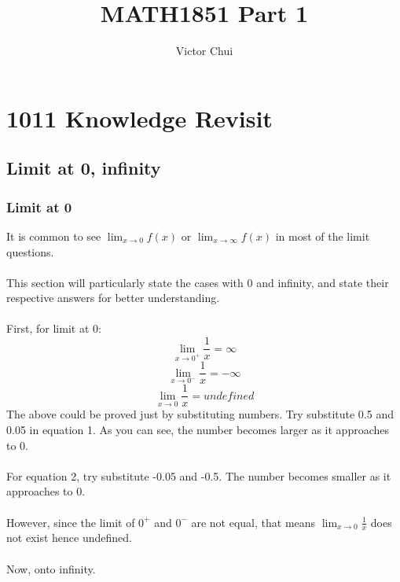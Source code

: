 \documentclass{article}
\title{MATH1851 Part 1}
\author{Victor Chui}
\begin{document}
\maketitle
\tableofcontents
\pagebreak

\section{1011 Knowledge Revisit}
\subsection{Limit at 0, infinity}
\subsubsection{Limit at 0}
It is common to see $\lim_{x \to 0} f(x)$ or $\lim_{x \to \infty} f(x)$
in most of the limit questions.\\\\ This section will particularly state the cases with 0 and infinity,
and state their respective answers for better understanding.\\
\\First, for limit at 0:
\begin{equation}
  \lim_{x \to 0^+} \frac{1}{x} = \infty
\end{equation}
\begin{equation} \label{eq:2} 
  \lim_{x \to 0^-} \frac{1}{x} = -\infty
\end{equation}
\begin{equation} \label{eq:3}
  \lim_{x \to 0} \frac{1}{x} = undefined
\end{equation}
The above could be proved just by substituting numbers. Try substitute 0.5 and 0.05 in equation 1.
As you can see, the number becomes larger as it approaches to 0.\\
\\For equation 2, try substitute -0.05 and -0.5. The number becomes smaller as it approaches to 0. \\\\
However, since the limit of $0^+$ and $0^-$ are not equal, that means $\lim_{x \to 0} \frac{1}{x}$ does not exist hence undefined.
\\
\\Now, onto infinity.
\end{document}

